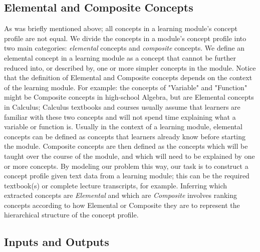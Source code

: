 \subsection{Elemental and Composite Concepts}\label{ec_concepts}
As was briefly mentioned above; all concepts in a learning module's concept profile are not equal.
We divide the concepts in a module's concept profile into two main categories: \textit{elemental} concepts and \textit{composite} concepts. 
We define an elemental concept in a learning module as a concept that cannot be further reduced into, or described by, one or more simpler concepts in the module. Notice that the definition of Elemental and Composite concepts depends on the context of the learning module. For example: the concepts of "Variable" and "Function" might be Composite concepts in high-school Algebra, but are Elemental concepts in Calculus; Calculus textbooks and courses usually assume that learners are familiar with these two concepts and will not spend time explaining what a variable or function is.
Usually in the context of a learning module, elemental concepts can be defined as concepts that learners already know before starting the module. Composite concepts are then defined as the concepts which will be taught over the course of the module, and which will need to be explained by one or more concepts.
By modeling our problem this way, our task is to construct a concept profile given text data from a learning module; this can be the required textbook(s) or complete lecture transcripts, for example. Inferring which extracted concepts are \textit{Elemental} and which are \textit{Composite} involves ranking concepts according to how Elemental or Composite they are to represent the hierarchical structure of the concept profile.

\subsection{Inputs and Outputs}\label{formal}

